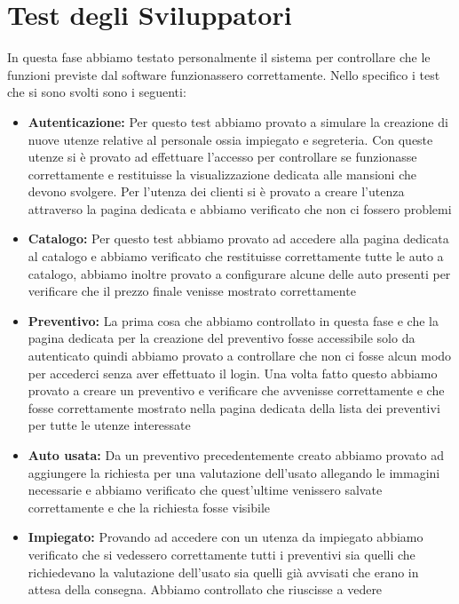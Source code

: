 \documentclass[a4paper, 11pt,oneside]{book}
\begin{document}
    \section{Test degli Sviluppatori}
        In questa fase abbiamo testato personalmente il sistema per controllare che le funzioni previste dal software funzionassero correttamente. Nello specifico i test che si sono svolti sono i seguenti:
        \begin{itemize}
            \item \textbf{Autenticazione:} Per questo test abbiamo provato a simulare la creazione di nuove utenze relative al personale ossia impiegato e segreteria. Con queste utenze si è provato ad effettuare l'accesso per controllare se funzionasse correttamente e restituisse la visualizzazione
            dedicata alle mansioni che devono svolgere. Per l'utenza dei clienti si è provato a creare l'utenza attraverso la pagina dedicata e abbiamo verificato che non ci fossero problemi
            \item \textbf{Catalogo:} Per questo test abbiamo provato ad accedere alla pagina dedicata al catalogo e abbiamo verificato che restituisse correttamente tutte le auto a catalogo, abbiamo inoltre provato a configurare alcune delle auto presenti per verificare che il prezzo finale venisse
            mostrato correttamente
            \item \textbf{Preventivo:} La prima cosa che abbiamo controllato in questa fase e che la pagina dedicata per la creazione del preventivo fosse accessibile solo da autenticato quindi abbiamo provato a controllare che non ci fosse alcun modo per accederci senza aver effettuato il login. Una volta
            fatto questo abbiamo provato a creare un preventivo e verificare che avvenisse correttamente e che fosse correttamente mostrato nella pagina dedicata della lista dei preventivi per tutte le utenze interessate
            \item \textbf{Auto usata:} Da un preventivo precedentemente creato abbiamo provato ad aggiungere la richiesta per una valutazione dell'usato allegando le immagini necessarie e abbiamo verificato che quest'ultime venissero salvate correttamente e che la richiesta fosse visibile
            \item \textbf{Impiegato:} Provando ad accedere con un utenza da impiegato abbiamo verificato che si vedessero correttamente tutti i preventivi sia quelli che richiedevano la valutazione dell'usato sia quelli già avvisati che erano in attesa della consegna. Abbiamo controllato che riuscisse a vedere

\end{itemize}
\end{document}
